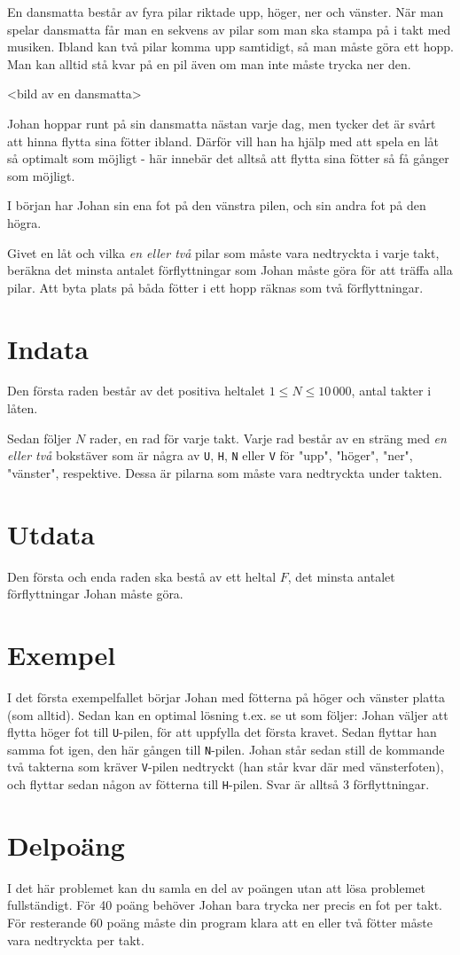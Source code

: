 En dansmatta består av fyra pilar riktade upp, höger, ner och vänster. När man spelar dansmatta får man en sekvens av pilar som man ska stampa på i takt med musiken. Ibland kan två pilar komma upp samtidigt, så man måste göra ett hopp. Man kan alltid stå kvar på en pil även om man inte måste trycka ner den.

<bild av en dansmatta>

Johan hoppar runt på sin dansmatta nästan varje dag, men tycker det är svårt att hinna flytta sina fötter ibland. Därför vill han ha hjälp med att spela en låt så optimalt som möjligt - här innebär det alltså att flytta sina fötter så få gånger som möjligt.

I början har Johan sin ena fot på den vänstra pilen, och sin andra fot på den högra.

Givet en låt och vilka \emph{en eller två} pilar som måste vara nedtryckta i varje takt, beräkna det minsta antalet förflyttningar som Johan måste göra för att träffa alla pilar. Att byta plats på båda fötter i ett hopp räknas som två förflyttningar.


\section*{Indata}
Den första raden består av det positiva heltalet $1 \le N \le 10\,000$, antal takter i låten.

Sedan följer $N$ rader, en rad för varje takt. Varje rad består av en sträng med \emph{en eller två} bokstäver som är några av \texttt{U}, \texttt{H}, \texttt{N} eller \texttt{V} för "upp", "höger", "ner", "vänster", respektive. Dessa är pilarna som måste vara nedtryckta under takten.

\section*{Utdata}
Den första och enda raden ska bestå av ett heltal $F$, det minsta antalet förflyttningar Johan måste göra.

\section*{Exempel}
I det första exempelfallet börjar Johan med fötterna på höger och vänster platta (som alltid). Sedan kan en optimal lösning t.ex. se ut som följer: Johan väljer att flytta höger fot till \texttt{U}-pilen, för att uppfylla det första kravet. Sedan flyttar han samma fot igen, den här gången till \texttt{N}-pilen. Johan står sedan still de kommande två takterna som kräver \texttt{V}-pilen nedtryckt (han står kvar där med vänsterfoten), och flyttar sedan någon av fötterna till \texttt{H}-pilen. Svar är alltså 3 förflyttningar.

\section*{Delpoäng}
I det här problemet kan du samla en del av poängen utan att lösa problemet fullständigt. För 40 poäng behöver Johan bara trycka ner precis en fot per takt. För resterande 60 poäng måste din program klara att en eller två fötter måste vara nedtryckta per takt.
